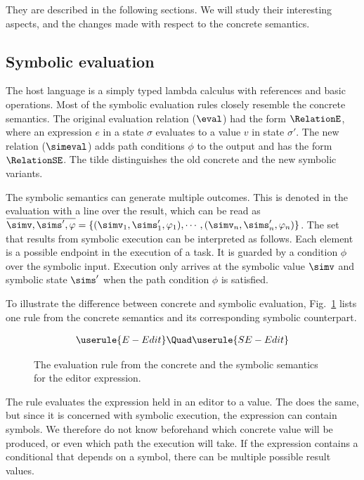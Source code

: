 They are described in the following sections.
We will study their interesting aspects, and the changes made with respect to the concrete semantics.



\subsection{Symbolic evaluation}

The host language is a simply typed lambda calculus with references and basic operations.
Most of the symbolic evaluation rules closely resemble the concrete semantics.
The original evaluation relation ($\eval$) had the form $\RelationE$,
where an expression $e$ in a state $\sigma$ evaluates to a value $v$ in state $\sigma'$.
The new relation ($\simeval$) adds path conditions $\phi$ to the output and has the form $\RelationSE$.
The tilde distinguishes the old concrete and the new symbolic variants.

The symbolic semantics can generate multiple outcomes.
This is denoted in the evaluation with a line over the result, which can be read as $\overline{\simv,\sims',\phi} = \{(\simv_1,\sims'_1,\phi_1),\cdots,(\simv_n,\sims'_n,\phi_n)\}$.
The set that results from symbolic execution can be interpreted as follows.
Each element is a possible endpoint in the execution of a task.
It is guarded by a condition $\phi$ over the symbolic input.
Execution only arrives at the symbolic value $\simv$ and symbolic state $\sims'$ when the path condition $\phi$ is satisfied.

To illustrate the difference between concrete and symbolic evaluation, Fig.~\ref{fig:oldToNewSemantics} lists one rule from the concrete semantics and its corresponding symbolic counterpart.

\begin{figure}[ht]
  \small
  \begin{gather*}
    \userule{E-Edit}\Quad
    \userule{SE-Edit}
  \end{gather*}
  \caption{The evaluation rule from the concrete and the symbolic semantics for the editor expression.}
  \label{fig:oldToNewSemantics}
\end{figure}

The  rule evaluates the expression held in an editor to a value.
The  does the same, but since it is concerned with symbolic execution, the expression can contain symbols.
We therefore do not know beforehand which concrete value will be produced, or even which path the execution will take.
If the expression contains a conditional that depends on a symbol, there can be multiple possible result values.

